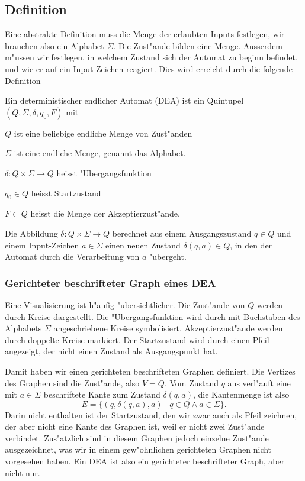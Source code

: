 \subsection{Definition}
Eine abstrakte Definition muss die Menge der erlaubten Inputs
festlegen, wir brauchen also ein Alphabet $\Sigma$. Die Zust"ande
bilden eine Menge. Ausserdem m"ussen wir festlegen, in welchem Zustand
sich der Automat zu beginn befindet, und wie er auf ein Input-Zeichen
reagiert. Dies wird erreicht durch die folgende Definition
\begin{definition}
Ein deterministischer endlicher Automat (DEA) ist ein Quintupel
$(Q,\Sigma,\delta, q_0,F)$ mit
\begin{compactenum}
\item $Q$ ist eine beliebige endliche Menge von Zust"anden
\item $\Sigma$ ist eine endliche Menge, genannt das Alphabet.
\item $\delta\colon Q\times\Sigma\to Q$ heisst "Ubergangsfunktion
\item $q_0\in Q$ heisst Startzustand
\item $F\subset Q$ heisst die Menge der Akzeptierzust"ande.
\end{compactenum}
\end{definition}
Die Abbildung $\delta\colon Q\times \Sigma\to Q$ berechnet
aus einem Ausgangszustand $q\in Q$ und einem Input-Zeichen $a\in\Sigma$
einen neuen Zustand $\delta(q,a)\in Q$, in den der Automat durch
die Verarbeitung von $a$ "ubergeht.

\subsubsection{Gerichteter beschrifteter Graph eines DEA}
Eine Visualisierung ist h"aufig "ubersichtlicher.
Die Zust"ande von $Q$ werden durch Kreise dargestellt. Die
"Ubergangsfunktion wird durch mit Buchstaben des Alphabets $\Sigma$
angeschriebene Kreise symbolisiert. Akzeptierzust"ande werden durch
doppelte Kreise markiert. Der Startzustand wird durch einen
Pfeil angezeigt, der nicht einen Zustand als Ausgangspunkt hat.

Damit haben wir einen gerichteten beschrifteten Graphen definiert.
Die Vertizes des Graphen sind die Zust"ande, also $V=Q$.
Vom Zustand $q$ aus verl"auft eine mit $a\in\Sigma$ beschriftete
Kante zum Zustand $\delta(q,a)$, 
die Kantenmenge
ist also
\[
E=\{(q,\delta(q,a),a)\;|\; q\in Q\wedge a\in\Sigma\}.
\]
Darin nicht enthalten ist der Startzustand, den wir zwar auch als
Pfeil zeichnen, der aber nicht eine Kante des Graphen ist, weil
er nicht zwei Zust"ande verbindet.
Zus"atzlich sind in diesem Graphen jedoch einzelne Zust"ande ausgezeichnet,
was wir in einem gew"ohnlichen gerichteten Graphen nicht vorgesehen
haben. Ein DEA ist also ein gerichteter beschrifteter Graph, aber nicht
nur.

